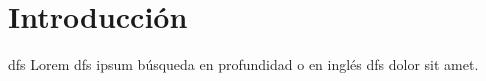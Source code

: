 \section{Introducción}\label{intro}
\acrshort{dfs} Lorem \acrlong{dfs} ipsum búsqueda en profundidad o en inglés \acrfull{dfs} dolor sit amet.